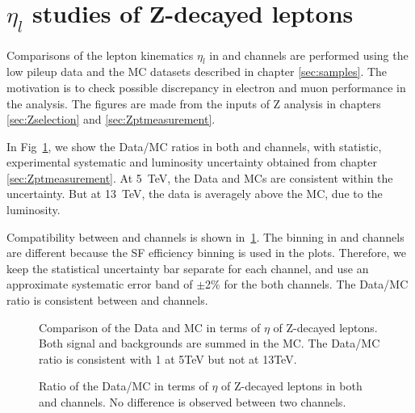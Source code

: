 \section{$\eta_l$ studies of Z-decayed leptons}
\label{sec:eta_Z}

Comparisons of the lepton kinematics $\eta_l$ in \Zee and \Zmm channels are performed using the low pileup data and the MC datasets described in chapter \ref{sec:samples}.
The motivation is to check possible discrepancy in electron and muon performance in the analysis.
The figures are made from the inputs of Z analysis in chapters \ref{sec:Zselection} and \ref{sec:Zptmeasurement}.

In Fig~\ref{fig:etaRatio_Z}, we show the Data/MC ratios in both \Zee and \Zmm channels, with statistic, experimental systematic and luminosity uncertainty obtained from chapter \ref{sec:Zptmeasurement}.
At 5~TeV, the Data and MCs are consistent within the uncertainty. But at 13~TeV, the data is averagely above the MC, due to the luminosity.

Compatibility between \Zee and \Zmm channels is shown in~\ref{fig:etaRatio_Z}.
The binning in \Zee and \Zmm channels are different because the SF efficiency binning is used in the plots.
Therefore, we keep the statistical uncertainty bar separate for each channel, and use an approximate systematic error band of $\pm$2\% for the both channels.
The Data/MC ratio is consistent between \Zee and \Zmm channels.

\begin{figure}[h]
\centering
{}

\caption{Comparison of the Data and MC in terms of $\eta$ of Z-decayed leptons. Both signal and backgrounds are summed in the MC. The Data/MC ratio is consistent with 1 at 5TeV but not at 13TeV.  }
\label{fig:etaRatio_Z}
\end{figure}


\begin{figure}[h]
\centering
{}
\caption{Ratio of the Data/MC in terms of $\eta$ of Z-decayed leptons in both \Zee and \Zmm channels.  No difference is observed between two channels. }
\label{fig:etaRatio_ZCombined}
\end{figure}